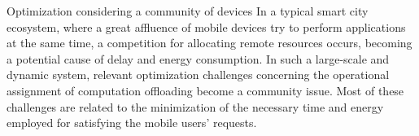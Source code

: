 \documentclass[twoside,openright]{report}
\makeatletter
\let\LaTeXStandardPart\part%
\newcommand{\unstarredpart@@noopt}[1]{%
  \unstarredpart@@opt[#1]{#1}%
}%
\newcommand{\unstarredpart@@opt}[2][]{%
  \cleardoublepage%
  \begingroup%
  \let\newpage\relax%
  \LaTeXStandardPart[#1]{#2}%
  \endgroup%
}%
\newcommand{\starredpart}[1]{%
  \LaTeXStandardPart*{#1}%
}%
\newcommand{\unstarredpart}{%
  \@ifnextchar[{\unstarredpart@@opt}{\unstarredpart@@noopt}%
}%
\renewcommand{\part}{%
  \@ifstar{\starredpart}{\unstarredpart}%
}%
\makeatother
\begin{document}
%
%
% 


 

\part{Optimization considering a community of devices}
In a typical smart city ecosystem, where a great affluence of mobile devices try to perform applications at the same time, a competition for allocating remote resources occurs, becoming a potential cause of delay and energy consumption.
In such a large-scale and dynamic system, relevant optimization challenges concerning the operational assignment of computation offloading become a community issue. Most of these challenges are related to the minimization of the necessary time and energy employed for satisfying the mobile users' requests.
\end{document}
